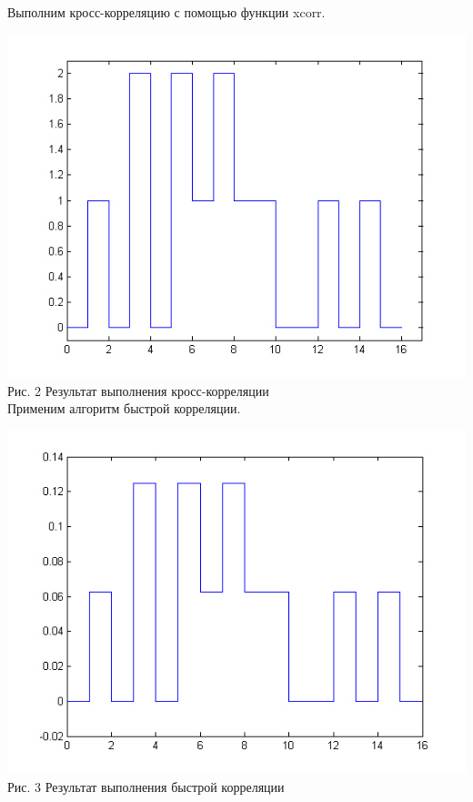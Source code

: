 \documentclass[a4paper]{article}
\begin{document}
\flushleft Выполним кросс-корреляцию с помощью функции xcorr.

\center\includegraphics[scale = 0.7]{xcorr.png} \\ Рис. 2 Результат выполнения кросс-корреляции \\

\flushleft Применим алгоритм быстрой корреляции.

\center\includegraphics[scale = 0.7]{fast.png} \\ Рис. 3 Результат выполнения быстрой корреляции \\
\end{document}
